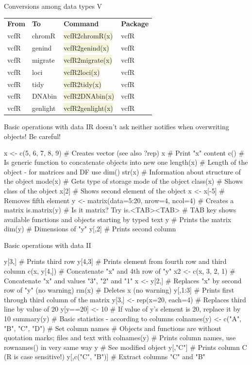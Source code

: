 \documentclass[compress, ucs, xelatex, 11pt, xcolor=svgnames, aspectratio=169,
	hyperref={
		bookmarks=true,
		unicode=true,
		colorlinks=true,
		pdftitle={Molecular data in R},
		plainpages=false,
		pdfauthor={Vojtech Zeisek},
		pdfsubject={Course about phylogeny and evolution in R},
		pdfcreator={XeLaTeX},
		pdfkeywords={R, evolution, phylogeny, molecular data},
		linkcolor=Crimson, %
		anchorcolor=Magenta, %
		citecolor=Magenta, %
		filecolor=Magenta, %
		menucolor=Magenta, %
		urlcolor=DodgerBlue, %
		pdftex},
	url={hyphens, lowtilde} %
	]{beamer}
\renewcommand{\texttt}[1]{\colorbox{Beige}{{\ttfamily #1}}}
\begin{document}
\begin{frame}{Conversions among data types V}
	\begin{tabular}{llll}
		\textbf{From} & \textbf{To} & \textbf{Command} & \textbf{Package}\\
		vcfR & chromR & \texttt{vcfR2chromR(x)} & vcfR\\
		vcfR & genind & \texttt{vcfR2genind(x)} & vcfR\\
		vcfR & migrate & \texttt{vcfR2migrate(x)} & vcfR\\
		vcfR & loci & \texttt{vcfR2loci(x)} & vcfR\\
		vcfR & tidy & \texttt{vcfR2tidy(x)} & vcfR\\
		vcfR & DNAbin & \texttt{vcfR2DNAbin(x)} & vcfR\\
		vcfR & genlight & \texttt{vcfR2genlight(x)} & vcfR
	\end{tabular}
\end{frame}

\begin{frame}[fragile]{Basic operations with data I}{\alert{R doesn't ask neither notifies when overwriting objects! Be careful!}}
	\begin{spluscode}
    x <- c(5, 6, 7, 8, 9) # Creates vector (see also ?rep)
    x # Print "x" content
    c() # Is generic function to concatenate objects into new one
    length(x) # Length of the object - for matrices and DF use dim()
    str(x) # Information about structure of the object
    mode(x) # Gets type of storage mode of the object
    class(x) # Shows class of the object
    x[2] # Shows second element of the object
    x <- x[-5] # Removes fifth element
    y <- matrix(data=5:20, nrow=4, ncol=4) # Creates a matrix
    is.matrix(y) # Is it matrix? Try is.<TAB><TAB>
    # TAB key shows available functions and objects starting by typed text
    y # Prints the matrix
    dim(y) # Dimensions of "y"
    y[,2] # Prints second column
	\end{spluscode}
\end{frame}

\begin{frame}[fragile]{Basic operations with data II}
	\begin{spluscode}
    y[3,] # Prints third row
    y[4,3] # Prints element from fourth row and third column
    c(x, y[4,]) # Concatenate "x" and 4th row of "y"
    x2 <- c(x, 3, 2, 1) # Concatenate "x" and values "3", "2" and "1"
    x <- y[2,] # Replaces "x" by second row of "y" (no warning)
    rm(x) # Deletes x (no warning)
    y[,1:3] # Prints first through third column of the matrix
    y[3,] <- rep(x=20, each=4) # Replaces third line by value of 20
    y[y==20] <- 10 # If value of y's element is 20, replace it by 10
    summary(y) # Basic statistics - according to columns
    colnames(y) <- c("A", "B", "C", "D") # Set column names
    # Objects and functions are without quotation marks; files and text with
    colnames(y) # Prints column names, use rownames() in very same way
    y # See modified object
    y[,"C"] # Prints column C (R is case sensitive!)
    y[,c("C", "B")] # Extract columns "C" and "B"
	\end{spluscode}
\end{frame}
\end{document}
